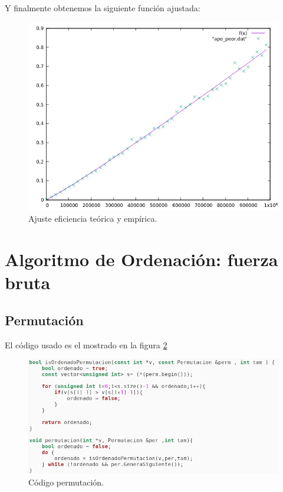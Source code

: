 Y finalmente obtenemos la siguiente función ajustada:
\begin{figure}[H]
    \begin{center}
        \includegraphics[scale=0.7]{imagenes/apo_adj.png}
        \caption{Ajuste eficiencia teórica y empírica.}
        \label{fig23}
    \end{center}
\end{figure}


\section{Algoritmo de Ordenación: fuerza bruta}

\subsection{Permutación}
El código usado es el mostrado en la figura  \ref{fig14}

\begin{figure}[H]
        \includegraphics[scale=0.6]{imagenes/permutacion.png}
        \caption{Código permutación.}
        \label{fig14}
\end{figure}

